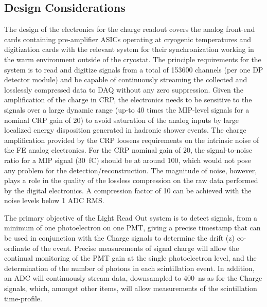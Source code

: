 \subsection{Design Considerations}
\label{sec:fddp-tpc-elec-des-consid}

The design of the electronics for the charge readout covers the analog front-end cards containing pre-amplifier ASICs operating at cryogenic temperatures and digitization cards with the relevant system for their synchronization working in the warm environment outside of the cryostat. The principle requirements for the system is to read and digitize signals from a total of \num{153600} channels (per one DP detector module) and be capable of continuously streaming the collected and losslessly compressed data to DAQ without any zero suppression. Given the amplification of the charge in CRP, the electronics needs to be sensitive to the signals over a large dynamic range (up-to \num{40} times the MIP-level signals for a nominal CRP gain of \num{20}) to avoid saturation of the analog inputs by large localized energy disposition generated in hadronic shower events. The charge amplification provided by the CRP loosens requirements on the intrinsic noise of the FE analog electronics. For the CRP nominal gain of \num{20}, the signal-to-noise ratio for a MIP signal (\SI{30}{fC}) should be at around \num{100}, which would not pose any problem for the detection/reconstruction. The magnitude of noise, however, plays a role in the quality of the lossless compression on the raw data performed by the digital electronics. A compression factor of \num{10} can be achieved with the noise levels below \num{1} ADC RMS.  %

The primary objective of the Light Read Out system is to detect signals, from a minimum of one photoelectron on one PMT, giving a precise timestamp that can be used in conjunction with the Charge signals to determine the drift (z) co-ordinate of the event.  Precise measurements of signal charge will allow the continual monitoring of the PMT gain at the single photoelectron level, and the determination of the number of photons in each scintillation event.  In addition, an ADC will continuously stream data, downsampled to \SI{400}{ns} as for the Charge signals,  which, amongst other items, will allow measurements of the scintillation time-profile. %


